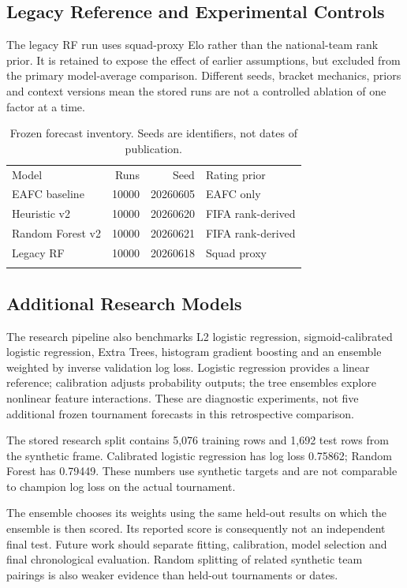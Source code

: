 \documentclass[11pt,a4paper]{article}
\newcommand{\toprule}{\noalign{\hrule height 0.8pt}\noalign{\vskip 3pt}}
\newcommand{\midrule}{\noalign{\vskip 2pt}\noalign{\hrule height 0.4pt}\noalign{\vskip 3pt}}
\newcommand{\bottomrule}{\noalign{\vskip 3pt}\noalign{\hrule height 0.8pt}}
\begin{document}
\subsection{Legacy Reference and Experimental Controls}
The legacy RF run uses squad-proxy Elo rather than the national-team rank prior.
It is retained to expose the effect of earlier assumptions, but excluded from
the primary model-average comparison. Different seeds, bracket mechanics,
priors and context versions mean the stored runs are not a controlled ablation
of one factor at a time.
\begin{table}[ht]
\centering\small
\caption{Frozen forecast inventory. Seeds are identifiers, not dates of publication.}
\begin{tabular}{lrrl}
\toprule
Model & Runs & Seed & Rating prior \\
\midrule
EAFC baseline & 10000 & 20260605 & EAFC only \\
Heuristic v2 & 10000 & 20260620 & FIFA rank-derived \\
Random Forest v2 & 10000 & 20260621 & FIFA rank-derived \\
Legacy RF & 10000 & 20260618 & Squad proxy \\
\bottomrule
\end{tabular}
\end{table}
\subsection{Additional Research Models}
The research pipeline also benchmarks L2 logistic regression, sigmoid-calibrated
logistic regression, Extra Trees, histogram gradient boosting and an ensemble
weighted by inverse validation log loss. Logistic regression provides a linear
reference; calibration adjusts probability outputs; the tree ensembles explore
nonlinear feature interactions. These are diagnostic experiments, not five
additional frozen tournament forecasts in this retrospective comparison.

The stored research split contains 5,076 training rows and 1,692 test rows from
the synthetic frame. Calibrated logistic regression has log loss 0.75862;
Random Forest has 0.79449. These numbers use synthetic targets and are not
comparable to champion log loss on the actual tournament.

The ensemble chooses its weights using the same held-out results on which the
ensemble is then scored. Its reported score is consequently not an independent
final test. Future work should separate fitting, calibration, model selection
and final chronological evaluation. Random splitting of related synthetic
team pairings is also weaker evidence than held-out tournaments or dates.
\end{document}
